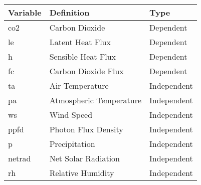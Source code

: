 
\begin{table}[H]
    \centering
    \begin{tabular}{@{}lll@{}}
    \toprule
    Variable & Definition & Type \\ \midrule
    co2 & Carbon Dioxide & Dependent \\
    le & Latent Heat Flux & Dependent \\
    h & Sensible Heat Flux & Dependent \\
    fc & Carbon Dioxide Flux & Dependent \\ \midrule
    ta & Air Temperature & Independent \\
    pa & Atmospheric Temperature & Independent \\
    ws & Wind Speed & Independent \\
    ppfd & Photon Flux Density & Independent \\
    p & Precipitation & Independent \\
    netrad & Net Solar Radiation & Independent \\
    rh & Relative Humidity & Independent \\ \bottomrule
    \end{tabular}
    \end{table}